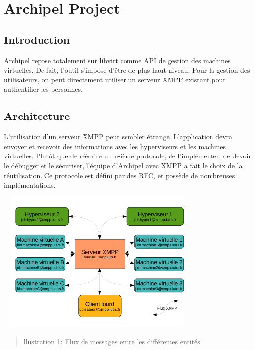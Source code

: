 \chapter{Archipel Project}
    \section{Introduction}
Archipel repose totalement sur libvirt comme API de gestion des machines virtuelles. De fait, l'outil
s'impose d'être de plus haut niveau. Pour la gestion des utilisateurs, on peut directement utiliser un
serveur XMPP existant pour authentifier les personnes.

    \section{Architecture}
L'utilisation d'un serveur XMPP peut sembler étrange. L'application devra envoyer et recevoir des
informations avec les hyperviseurs et les machines virtuelles. Plutôt que de réécrire un n-ième protocole,
de l'implémenter, de devoir le débugger et le sécuriser, l'équipe d'Archipel avec XMPP a fait le choix de la
réutilisation. Ce protocole est défini par des RFC, et possède de nombreuses implémentations.
\begin{center}
\includegraphics[width=10cm,height=7cm]{images/archi_archipel.png}
\begin{quote}llustration 1: Flux de messages entre les différentes entités\end{quote}
\end{center}

